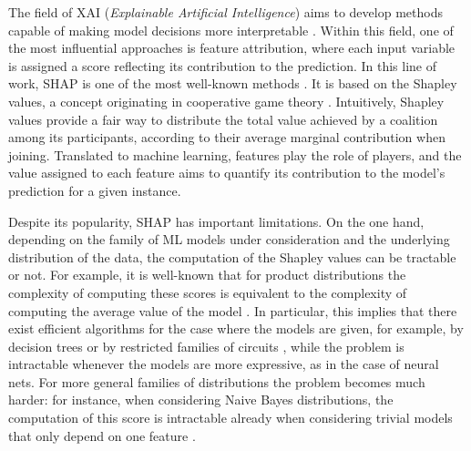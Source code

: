 
The field of XAI (\textit{Explainable Artificial Intelligence}) aims to develop methods capable of making model decisions more interpretable \parencite{mersha2024explainable}. Within this field, one of the most influential approaches is feature attribution, where each input variable is assigned a score reflecting its contribution to the prediction. 
In this line of work, SHAP is one of the most well-known methods \parencite{shapOriginalPaper}. It is based on the Shapley values, a concept originating in cooperative game theory \parencite{shapley1953value}. 
Intuitively, Shapley values provide a fair way to distribute the total value achieved by a coalition among its participants, according to their average marginal contribution when joining. 
Translated to machine learning, features play the role of players, and the value assigned to each feature aims to quantify its contribution to the model’s prediction for a given instance.

Despite its popularity, SHAP has important limitations. On the one hand, depending on the family of ML models under consideration and the underlying distribution of the data, the computation of the Shapley values can be tractable or not. For example,
it is well-known that for product distributions the complexity of computing these scores is equivalent to the complexity of computing the average 
value of the model \parencite{van2022tractability}. In particular, this implies that there exist efficient algorithms for the case where the models are given, for example, by decision trees or by restricted families of circuits \parencite{arenas2023complexity}, while the problem is intractable whenever the models are more expressive, as in the case of neural nets. 
For more general families of distributions the problem becomes much harder: for instance, when considering Naive Bayes distributions, the computation of this score is intractable already when considering trivial models that only depend on one feature \parencite{van2022tractability}.

